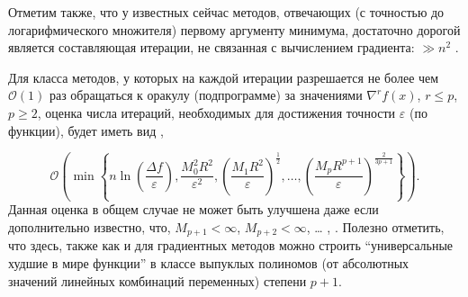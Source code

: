   Отметим также, что у известных сейчас методов, отвечающих (с точностью до логарифмического множителя) первому аргументу минимума, достаточно дорогой является составляющая итерации, не связанная с вычислением градиента: $\gg n^2$ \cite{lee2015faster}.

  Для класса методов, у которых на каждой итерации разрешается не более чем $\mathcal{O}\left( 1 \right)$ раз обращаться к оракулу (подпрограмме) за значениями $\nabla ^rf\left( x \right)$, $r\le p$, $p\ge 2$, оценка числа итераций, необходимых для достижения точности $\varepsilon $ (по функции), будет иметь вид \cite{gasnikov2018global}, \cite{monteiro2013accelerated}
  \iffalse
  \begin{equation*}
  \begin{aligned}
   \mathcal{O}\left( {\min \left\{ {n\ln \left( {\frac{\Delta f}{\varepsilon }} 
  \right);\;\;\frac{M_0^2 R^2}{\varepsilon ^2},\;\left( {\frac{M_1 
  R^2}{\varepsilon }} \right)^{1 \mathord{\left/ {\vphantom {1 2}} \right. 
  \kern-\nulldelimiterspace} 2},\; \left( {\frac{M_2 R^3}{\varepsilon }} 
  \right)^{2 \mathord{\left/ {\vphantom {2 7}} \right. 
  \kern-\nulldelimiterspace} 7},\;...,\;\left( {\frac{M_p R^{p+1}}{\varepsilon 
  }} \right)^{2 \mathord{\left/ {\vphantom {2 {\left( {3p+1} \right)}}} 
  \right. \kern-\nulldelimiterspace} {\left( {3p+1} \right)}};} \right.} 
  \right. \\ 
   \min \left. {\left. {\left\{ {\left( {\frac{M_1 }{\mu }} \right)^{1 
  \mathord{\left/ {\vphantom {1 2}} \right. \kern-\nulldelimiterspace} 
  2},\;\left( {\frac{M_2 R}{\mu }} \right)^{2 \mathord{\left/ {\vphantom {2 
  7}} \right. \kern-\nulldelimiterspace} 7},\;...,\left( {\frac{M_p 
  R^{p-1}}{\mu }} \right)^{2 \mathord{\left/ {\vphantom {2 {\left( {3p+1} 
  \right)}}} \right. \kern-\nulldelimiterspace} {\left( {3p+1} \right)}}} 
  \right\}+\min_{r=2,...,p}\log \log \left( {\frac{\left( {{\mu ^{r+1}} \mathord{\left/ 
  {\vphantom {{\mu ^{r+1}} {M_r^2 }}} \right. \kern-\nulldelimiterspace} 
  {M_r^2 }} \right)^{1 \mathord{\left/ {\vphantom {1 {\left( {r-1} \right)}}} 
  \right. \kern-\nulldelimiterspace} {\left( {r-1} \right)}}}{\varepsilon }} 
  \right)} \right\} } \right). \\ 
  \end{aligned}
  \end{equation*}%
  \fi

  $$\mathcal{O}\left(\min\left\{n\ln\left(\frac{\Delta f}{\varepsilon}\right),\frac{M_0^2 R^2}{\varepsilon^2}, \left(\frac{M_1 R^2}{\varepsilon}\right)^\frac{1}{2},\ldots, \left(\frac{M_pR^{p+1}}{\varepsilon}\right)^\frac{2}{3p+1}\right\}\right).$$
  Данная оценка в общем случае не может быть улучшена даже если дополнительно известно, что, $M_{p+1} <\infty $, $M_{p+2} <\infty $, {\ldots} \cite{nesterov2018implementable}, \cite{arjevani2017oracle}. Полезно отметить, что здесь, также как и для градиентных методов можно строить ``универсальные худшие в мире функции'' в классе выпуклых полиномов (от абсолютных значений линейных комбинаций переменных) степени $p+1$. 

